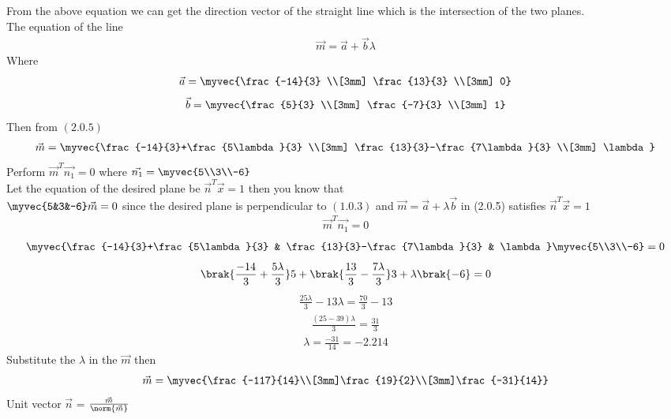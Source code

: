 \documentclass[journal,12pt,twocolumn]{IEEEtran}
\begin{document}
From the above equation we can get the direction vector of the straight line which is the intersection of the two planes.\\[1.5ex]
The equation of the line\\
\begin{align}
\vec{m} = \vec{a}+\vec{b}\lambda
\end{align}
Where\\
\begin{align}
\vec{a} = \myvec{\frac{-14}{3} \\[3mm] \frac{13}{3} \\[3mm] 0}
\end{align}
\begin{align}
\vec{b} = \myvec{\frac{5}{3} \\[3mm] \frac{-7}{3} \\[3mm] 1}
\end{align}
Then from $ (2.0.5) $
\begin{align}
\vec{m} = \myvec{\frac{-14}{3}+\frac{5\lambda}{3} \\[3mm] \frac{13}{3}-\frac{7\lambda}{3} \\[3mm] \lambda}
\end{align}
Perform $\vec{m}^T\vec{n_1} = 0 $ where $\vec{n_1} = \myvec{5\\3\\-6}$\\
Let the equation of the desired plane be $\vec{n}^T\vec{x} = 1$ then you know that\\
$ \myvec{5&3&-6}\vec{m} = 0$ since the desired plane is perpendicular to $ (1.0.3) $ and $ \vec{m} = \vec{a}+\lambda\vec{b}$ in (2.0.5) satisfies $\vec{n}^T\vec{x} = 1$
\begin{align}
\vec{m}^T\vec{n_1} = 0
\end{align}
\begin{align}
\myvec{\frac{-14}{3}+\frac{5\lambda}{3} & \frac{13}{3}-\frac{7\lambda}{3} & \lambda}\myvec{5\\3\\-6} = 0
\end{align}
\begin{align}
\brak{\frac{-14}{3}+\frac{5\lambda}{3}}5 + \brak{\frac{13}{3}-\frac{7\lambda}{3}}3 + \lambda\brak{-6} = 0
\end{align}
\begin{align}
\frac{25\lambda}{3} - 13\lambda = \frac{70}{3} - 13
\end{align}
\begin{align}
\frac{(25-39)\lambda}{3} = \frac{31}{3}
\end{align}
\begin{align}
	\lambda = \frac{-31}{14} = -2.214
\end{align}
Substitute the $ \lambda $ in the $\vec{m}$ then\\
\begin{align}
\vec{m} = \myvec{\frac{-117}{14}\\[3mm]\frac{19}{2}\\[3mm]\frac{-31}{14}}
\end{align}
Unit vector $\vec{n}$ = $ \frac{\vec{m}}{\norm{\vec{m}}} $
\end{document}
